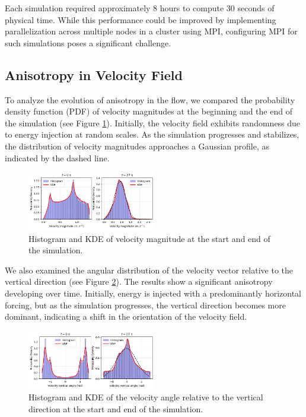 \documentclass[final,5p,times,twocolumn,authoryear]{elsarticle}
\begin{document}
Each simulation required approximately 8 hours to compute 30 seconds of physical time. While this performance could be improved by implementing parallelization across multiple nodes in a cluster using MPI, configuring MPI for such simulations poses a significant challenge.

\subsection{Anisotropy in Velocity Field}

To analyze the evolution of anisotropy in the flow, we compared the probability density function (PDF) of velocity magnitudes at the beginning and the end of the simulation (see Figure \ref{fig:mag PDF}). Initially, the velocity field exhibits randomness due to energy injection at random scales. As the simulation progresses and stabilizes, the distribution of velocity magnitudes approaches a Gaussian profile, as indicated by the dashed line.

\begin{figure}[h]
\centering
\includegraphics[width=0.5\textwidth]{fig/magnitude_pdf.png}
\caption{Histogram and KDE of velocity magnitude at the start and end of the simulation.}
\label{fig:mag PDF}
\end{figure}

We also examined the angular distribution of the velocity vector relative to the vertical direction (see Figure \ref{fig:angle PDF}). The results show a significant anisotropy developing over time. Initially, energy is injected with a predominantly horizontal forcing, but as the simulation progresses, the vertical direction becomes more dominant, indicating a shift in the orientation of the velocity field.

\begin{figure}[h]
\centering
\includegraphics[width=0.5\textwidth]{fig/angle_pdf.png}
\caption{Histogram and KDE of the velocity angle relative to the vertical direction at the start and end of the simulation.}
\label{fig:angle PDF}
\end{figure}
\end{document}
